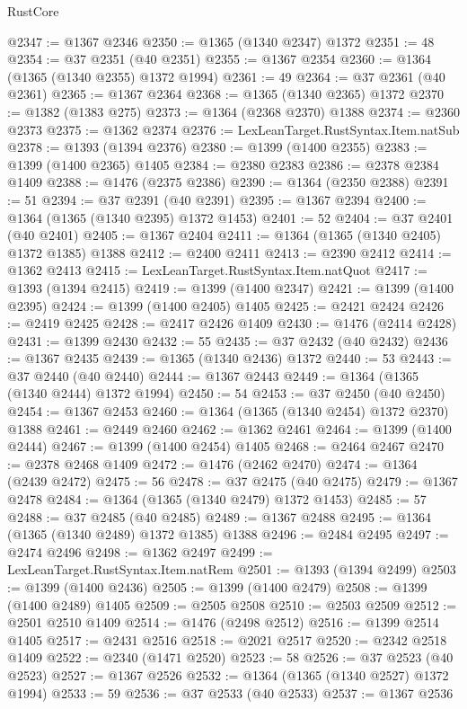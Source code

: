 \begin{lexlean}{RustCore}
\begin{coremodule}
@2347 := @1367 @2346
@2350 := @1365 (@1340 @2347) @1372
@2351 := 48
@2354 := @37 @2351 (@40 @2351)
@2355 := @1367 @2354
@2360 := @1364 (@1365 (@1340 @2355) @1372 @1994)
@2361 := 49
@2364 := @37 @2361 (@40 @2361)
@2365 := @1367 @2364
@2368 := @1365 (@1340 @2365) @1372
@2370 := @1382 (@1383 @275)
@2373 := @1364 (@2368 @2370) @1388
@2374 := @2360 @2373
@2375 := @1362 @2374
@2376 := LexLeanTarget.RustSyntax.Item.natSub
@2378 := @1393 (@1394 @2376)
@2380 := @1399 (@1400 @2355)
@2383 := @1399 (@1400 @2365) @1405
@2384 := @2380 @2383
@2386 := @2378 @2384 @1409
@2388 := @1476 (@2375 @2386)
@2390 := @1364 (@2350 @2388)
@2391 := 51
@2394 := @37 @2391 (@40 @2391)
@2395 := @1367 @2394
@2400 := @1364 (@1365 (@1340 @2395) @1372 @1453)
@2401 := 52
@2404 := @37 @2401 (@40 @2401)
@2405 := @1367 @2404
@2411 := @1364 (@1365 (@1340 @2405) @1372 @1385) @1388
@2412 := @2400 @2411
@2413 := @2390 @2412
@2414 := @1362 @2413
@2415 := LexLeanTarget.RustSyntax.Item.natQuot
@2417 := @1393 (@1394 @2415)
@2419 := @1399 (@1400 @2347)
@2421 := @1399 (@1400 @2395)
@2424 := @1399 (@1400 @2405) @1405
@2425 := @2421 @2424
@2426 := @2419 @2425
@2428 := @2417 @2426 @1409
@2430 := @1476 (@2414 @2428)
@2431 := @1399 @2430
@2432 := 55
@2435 := @37 @2432 (@40 @2432)
@2436 := @1367 @2435
@2439 := @1365 (@1340 @2436) @1372
@2440 := 53
@2443 := @37 @2440 (@40 @2440)
@2444 := @1367 @2443
@2449 := @1364 (@1365 (@1340 @2444) @1372 @1994)
@2450 := 54
@2453 := @37 @2450 (@40 @2450)
@2454 := @1367 @2453
@2460 := @1364 (@1365 (@1340 @2454) @1372 @2370) @1388
@2461 := @2449 @2460
@2462 := @1362 @2461
@2464 := @1399 (@1400 @2444)
@2467 := @1399 (@1400 @2454) @1405
@2468 := @2464 @2467
@2470 := @2378 @2468 @1409
@2472 := @1476 (@2462 @2470)
@2474 := @1364 (@2439 @2472)
@2475 := 56
@2478 := @37 @2475 (@40 @2475)
@2479 := @1367 @2478
@2484 := @1364 (@1365 (@1340 @2479) @1372 @1453)
@2485 := 57
@2488 := @37 @2485 (@40 @2485)
@2489 := @1367 @2488
@2495 := @1364 (@1365 (@1340 @2489) @1372 @1385) @1388
@2496 := @2484 @2495
@2497 := @2474 @2496
@2498 := @1362 @2497
@2499 := LexLeanTarget.RustSyntax.Item.natRem
@2501 := @1393 (@1394 @2499)
@2503 := @1399 (@1400 @2436)
@2505 := @1399 (@1400 @2479)
@2508 := @1399 (@1400 @2489) @1405
@2509 := @2505 @2508
@2510 := @2503 @2509
@2512 := @2501 @2510 @1409
@2514 := @1476 (@2498 @2512)
@2516 := @1399 @2514 @1405
@2517 := @2431 @2516
@2518 := @2021 @2517
@2520 := @2342 @2518 @1409
@2522 := @2340 (@1471 @2520)
@2523 := 58
@2526 := @37 @2523 (@40 @2523)
@2527 := @1367 @2526
@2532 := @1364 (@1365 (@1340 @2527) @1372 @1994)
@2533 := 59
@2536 := @37 @2533 (@40 @2533)
@2537 := @1367 @2536

\end{coremodule}
\end{lexlean}

